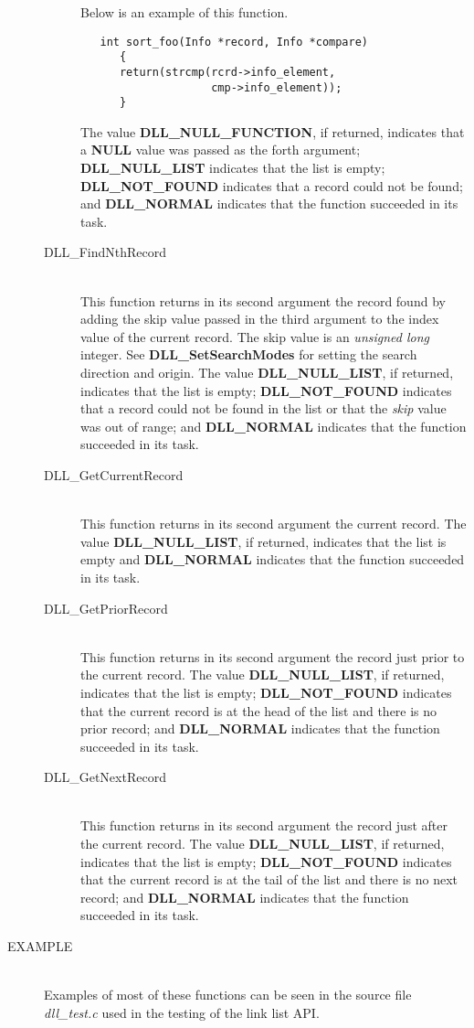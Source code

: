 \documentclass[10pt,letterpaper,titlepage]{article}
\begin{document}
\begin{description}
\begin{description}
 Below is an example of this function.

 \begin{verbatim}
   int sort_foo(Info *record, Info *compare)
      {
      return(strcmp(rcrd->info_element,
                    cmp->info_element));
      }

\end{verbatim}

  The value \textbf{DLL\_NULL\_FUNCTION}, if returned, indicates that a \textbf{NULL} value was passed as the forth argument; \textbf{DLL\_NULL\_LIST} indicates that the list is empty; \textbf{DLL\_NOT\_FOUND} indicates that a record could not be found; and \textbf{DLL\_NORMAL} indicates that the function succeeded in its task.

 \item[DLL\_FindNthRecord]\quad\\
 This function returns in its second argument the record found by adding the skip value passed in the third argument to the index value of the current record.  The skip value is an \emph{unsigned long} integer.  See \textbf{DLL\_SetSearchModes} for setting the search direction and origin.  The value \textbf{DLL\_NULL\_LIST}, if returned, indicates that the list is empty; \textbf{DLL\_NOT\_FOUND} indicates that a record could not be found in the list or that the \emph{skip} value was out of range; and \textbf{DLL\_NORMAL} indicates that the function succeeded in its task.

 \item[DLL\_GetCurrentRecord]\quad\\
 This function returns in its second argument the current record.  The value \textbf{DLL\_NULL\_LIST}, if returned, indicates that the list is empty and \textbf{DLL\_NORMAL} indicates that the function succeeded in its task.

 \item[DLL\_GetPriorRecord]\quad\\
 This function returns in its second argument the record just prior to the current record.  The value \textbf{DLL\_NULL\_LIST}, if returned, indicates that the list is empty; \textbf{DLL\_NOT\_FOUND} indicates that the current record is at the head of the list and there is no prior record; and \textbf{DLL\_NORMAL} indicates that the function succeeded in its task.

 \item[DLL\_GetNextRecord]\quad\\
 This function returns in its second argument the record just after the current record.  The value \textbf{DLL\_NULL\_LIST}, if returned, indicates that the list is empty; \textbf{DLL\_NOT\_FOUND} indicates that the current record is at the tail of the list and there is no next record; and \textbf{DLL\_NORMAL} indicates that the function succeeded in its task.
 \end{description}

\item[EXAMPLE]\quad\\
Examples of most of these functions can be seen in the source file \emph{dll\_test.c} used in the testing of the link list API.

\end{description}
\end{document}
